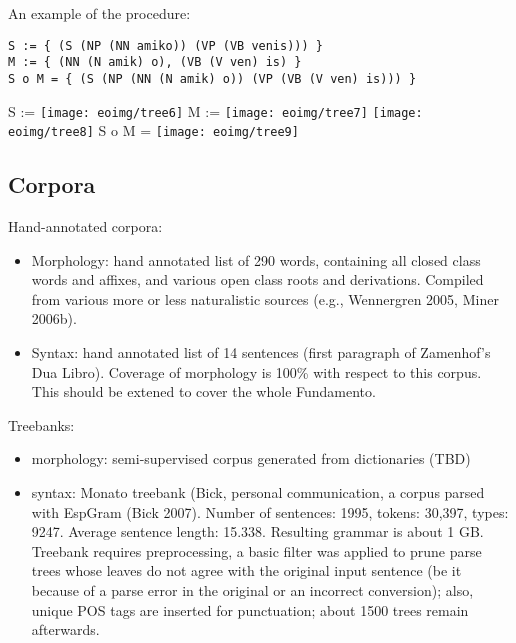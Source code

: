 \documentclass[10pt,a4paper]{article}
\begin{document}
An example of the procedure:

\begin{verbatim}
S := { (S (NP (NN amiko)) (VP (VB venis))) } 
M := { (NN (N amik) o), (VB (V ven) is) }
S o M = { (S (NP (NN (N amik) o)) (VP (VB (V ven) is))) }
\end{verbatim}
S := %
\texttt{[image: eoimg/tree6]}
M := %
\texttt{[image: eoimg/tree7]}
\texttt{[image: eoimg/tree8]}
S o M = %
\texttt{[image: eoimg/tree9]}

\subsection{Corpora}

Hand-annotated corpora:

\begin{itemize}
\item Morphology: hand annotated list of 290 words, containing all closed class
      words and affixes, and various open class roots and derivations. Compiled
      from various more or less naturalistic sources (e.g., Wennergren 2005,
      Miner 2006b).
\item Syntax: hand annotated list of 14 sentences (first paragraph of
      Zamenhof's Dua Libro). Coverage of morphology is 100\% with respect to
      this corpus. This should be extened to cover the whole Fundamento.
\end{itemize}

Treebanks:

\begin{itemize}
\item morphology: semi-supervised corpus generated from dictionaries (TBD)
\item syntax: Monato treebank (Bick, personal communication, a corpus parsed
      with EspGram (Bick 2007).  Number of sentences: 1995, tokens: 30,397,
      types: 9247. Average sentence length: 15.338. Resulting grammar is about
      1 GB. Treebank requires preprocessing, a basic filter was applied to
      prune parse trees whose leaves do not agree with the original input
      sentence (be it because of a parse error in the original or an incorrect
      conversion); also, unique POS tags are inserted for punctuation; about
      1500 trees remain afterwards.
\end{itemize}
\end{document}
